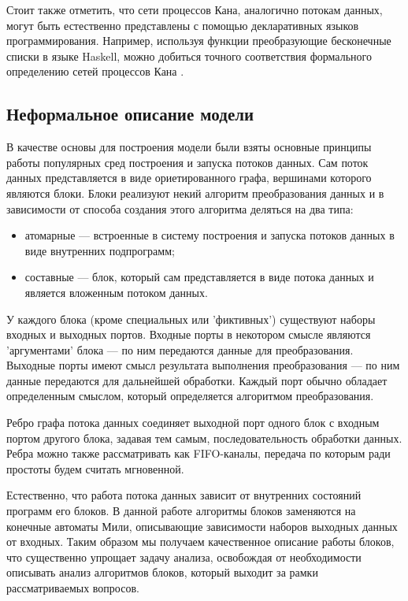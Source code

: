 \documentclass[10pt,a4paper]{article}
\begin{document}
Стоит также отметить, что сети процессов Кана, аналогично потокам данных,
могут быть естественно представлены с помощью декларативных языков программирования.
Например, используя функции преобразующие бесконечные списки в языке Haskell, можно добиться точного соответствия формального определению сетей процессов Кана \cite{data-flow-process-networks}. 

\subsection{Неформальное описание модели}

В качестве основы для построения модели были взяты основные принципы работы популярных сред построения и запуска потоков данных.
Сам поток данных представляется в виде ориетированного графа, вершинами которого являются блоки.
Блоки реализуют некий алгоритм преобразования данных и в зависимости от способа создания этого алгоритма деляться на два типа:
\begin{itemize}
  \item атомарные --- встроенные в систему построения и запуска потоков данных в виде внутренних подпрограмм;
  \item составные --- блок, который сам представляется в виде потока данных и является вложенным потоком данных.
\end{itemize}
У каждого блока (кроме специальных или 'фиктивных') существуют наборы входных и выходных портов. Входные порты в некотором смысле являются 'аргументами' блока ---
по ним передаются данные для преобразования. Выходные порты имеют смысл результата выполнения преобразования --- по ним данные передаются для дальнейшей обработки.
Каждый порт обычно обладает определенным смыслом, который определяется алгоритмом преобразования.

Ребро графа потока данных соединяет выходной порт одного блок с входным портом другого блока, задавая тем самым, последовательность обработки данных.
Ребра можно также рассматривать как FIFO-каналы, передача по которым ради простоты будем считать мгновенной.

Естественно, что работа потока данных зависит от внутренних состояний программ его блоков. В данной работе алгоритмы блоков заменяются на конечные автоматы Мили,
описывающие зависимости наборов выходных данных от входных. Таким образом мы получаем качественное описание работы блоков, что существенно упрощает
задачу анализа, освобождая от необходимости описывать анализ алгоритмов блоков, который выходит за рамки рассматриваемых вопросов.
\end{document}
